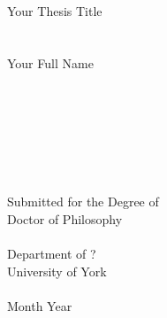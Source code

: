 \pagestyle{empty}

\begin{center}
\ \\ \ \\ \ \\
\huge{Your Thesis Title}
\\ \ \\ \ \\ 
\LARGE{Your Full Name}
\\ \ \\ \ \\ \ \\ \ \\ \ \\ \ \\ \ \\ 
\Large{Submitted for the Degree of} \\
\Large{Doctor of Philosophy}
\\ \ \\
\Large{Department of ?}\\
\Large{University of York}
\\ \ \\
\Large{Month Year} 
\end{center}
